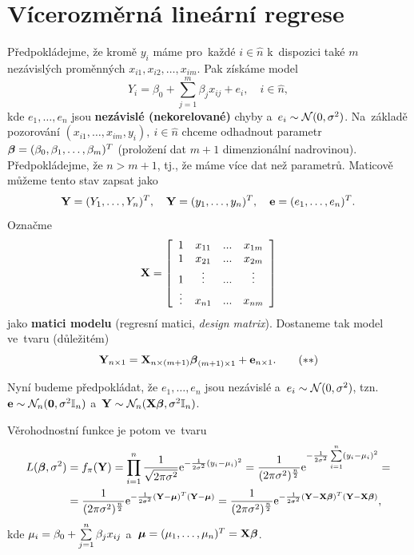 \chapter{Vícerozměrná lineární regrese}

Předpokládejme, že kromě $y_i$ máme pro~každé $i\in\widehat{n}$ k~dispozici také $m$ nezávislých proměnných $x_{i1},x_{i2},\dots,x_{im}$. Pak získáme model
 $$ Y_i = \beta_0+\sum_{j = 1}^m \beta_j x_{ij}+e_i,\quad i\in\widehat{n}, $$
kde $e_1,\dots,e_n$ jsou \textbf{nezávislé (nekorelované)} chyby a~$e_i\sim\mathcal{N}(0,\sigma^2)$. Na~základě pozorování $(x_{i1},\dots,x_{im},y_i),~i\in\widehat{n}$ chceme odhadnout parametr $\boldsymbol{\beta} = (\beta_0,\beta_1,\dots,\beta_m)^T$ (proložení dat \linebreak $m+1$ dimenzionální nadrovinou). Předpokládejme, že $n>m+1$, tj., že máme více dat než parametrů. Maticově můžeme tento stav zapsat jako
 $$ \mathbf{Y} = (Y_1,\dots,Y_n)^T,\quad \mathbf{Y} = (y_1,\dots,y_n)^T,\quad \mathbf{e} = (e_1,\dots,e_n)^T. $$
Označme
 $$ \mathbf{X} = \left[\begin{array}{cccc}
1 & x_{11} &... & x_{1m} \\
1 & x_{21} &... & x_{2m} \\
1 & \vdots &... & \vdots \\
 \vdots& x_{n1} &... & x_{nm}
\end{array}
 \right] $$ jako \textbf{matici modelu} (regresní matici, \textit{design matrix}). Dostaneme tak model ve~tvaru (důležitém)
  \begin{equation}\label{the_chosen_one}
 \mathbf{Y}_{n\times 1} = \mathbf{X}_{n\times(m+1)}\boldsymbol{\beta}_{(m+1)\times 1}+\mathbf{e}_{n\times 1}. \tag{$**$}
 \end{equation}

 Nyní budeme předpokládat, že $e_1,\dots,e_n$ jsou nezávislé a~$e_i \sim\mathcal{N}(0,\sigma^2)$, tzn. $\mathbf{e}\sim\mathcal{N}_n(\boldsymbol{0},\sigma^2 \mathbb{I}_{n})$ a~$\mathbf{Y}\sim\mathcal{N}_n(\mathbf{X}\boldsymbol{\beta},\sigma^2 \mathbb{I}_{n})$.

 Věrohodnostní funkce je potom ve~tvaru
 \begin{align*}
 L(\boldsymbol{\beta},\sigma^2)& = f_\pi(\mathbf{Y}) = \prod_{i = 1}^n \frac{1}{\sqrt{2\pi\sigma^2}}\mathrm{e}^{-\frac{1}{2\sigma^2}(y_i-\mu_i)^2} = \frac{1}{(2\pi\sigma^2)^{\frac{n}{2}}}\mathrm{e}^{-\frac{1}{2\sigma^2}\sum\limits_{i=1}^{n} (y_i-\mu_i)^2} = \\ & = \frac{1}{(2\pi\sigma^2)^{\frac{n}{2}}}\mathrm{e}^{-\frac{1}{2\sigma^2}(\mathbf{Y}-\boldsymbol{\mu})^T(\mathbf{Y}-\boldsymbol{\mu})} = \frac{1}{(2\pi\sigma^2)^{\frac{n}{2}}}\mathrm{e}^{-\frac{1}{2\sigma^2}(\mathbf{Y}-\mathbf{X}\boldsymbol{\beta})^T(\mathbf{Y}-\mathbf{X}\boldsymbol{\beta})},
 \end{align*}
kde $\mu_i = \beta_0+\sum\limits_{j=1}^{n} \beta_j x_{ij}$ a~$\boldsymbol{\mu} = (\mu_1,\dots,\mu_n)^T = \mathbf{X}\boldsymbol{\beta}$.

